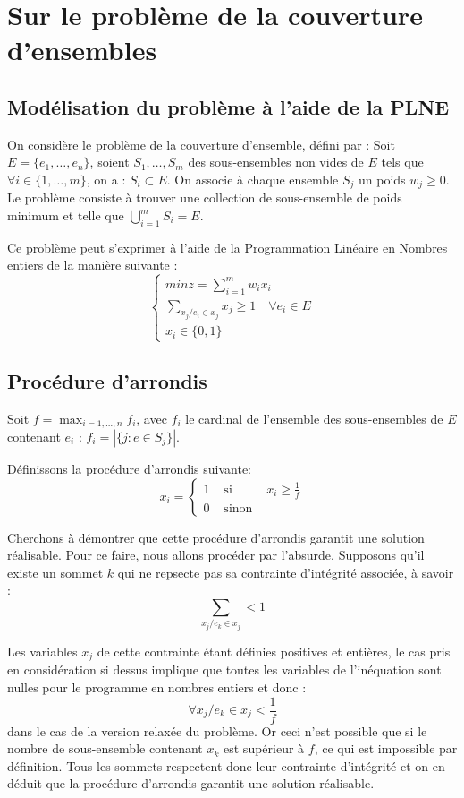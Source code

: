 \section{Sur le problème de la couverture d'ensembles}

\subsection{Modélisation du problème à l'aide de la PLNE}

On considère le problème de la couverture d'ensemble, défini par :
Soit $E = \lbrace e_1, \dots, e_n \rbrace$, soient $S_1, \dots, S_m$ des sous-ensembles non vides
de $E$ tels que $\forall i \in \{1, \dots, m\}$, on a : $S_i \subset E$. On associe à chaque
ensemble $S_j$ un poids $w_j \geq 0$. Le problème consiste à trouver une collection de sous-ensemble
de poids minimum et telle que $\bigcup_{i=1}^m S_i = E$.

Ce problème peut s'exprimer à l'aide de la Programmation Linéaire en Nombres entiers de la manière
suivante : $$
\left \lbrace
\begin{array}{l}
	min z = \sum_{i=1}^m w_ix_i \\
	\sum_{x_j / e_i \in x_j} x_j \geq 1 \quad \forall e_i \in E \\
	x_i \in \{0, 1\}
\end{array} \right.
$$

\subsection{Procédure d'arrondis}

Soit $f = \max_{i=1,\dots,n} f_i$, avec $f_i$ le cardinal de l'ensemble des sous-ensembles de $E$
contenant $e_i$ : $ f_i = |\{j : e \in S_j\}|$.

Définissons la procédure d'arrondis suivante: $$
x_i = \left \{ \begin{array}{rcl}
		1 & \mbox{ si } & x_i \geq \frac{1}{f} \\
		0 & \mbox{ sinon } &
	\end{array} \right .
	$$

Cherchons à démontrer que cette procédure d'arrondis garantit une solution réalisable. Pour ce
faire, nous allons procéder par l'absurde. Supposons qu'il existe un sommet $k$ qui ne repsecte pas
sa contrainte d'intégrité associée, à savoir : $$
\sum_{x_j / e_k \in x_j} < 1 $$

Les variables $x_j$ de cette contrainte étant définies positives et entières, le cas pris en
considération si dessus implique que toutes les variables de l'inéquation sont nulles pour le
programme en nombres entiers et donc : $$
\forall x_j / e_k \in x_j < \frac{1}{f} $$ dans le cas de la version relaxée du problème. Or ceci
n'est possible que si le nombre de sous-ensemble contenant $x_k$ est supérieur à $f$, ce qui est
impossible par définition. Tous les sommets respectent donc leur contrainte d'intégrité et on en
déduit que la procédure d'arrondis garantit une solution réalisable.

